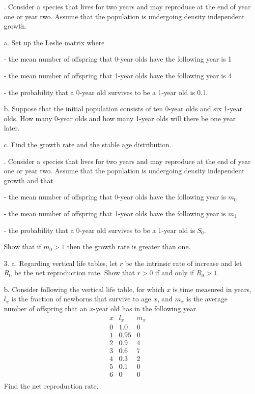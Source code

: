\documentclass[reqno,12pt]{amsart}
\begin{document}
\newpage

.  Consider a species that lives for two years and may reproduce
at the end of year one or year two.  Assume that the population is
undergoing density independent growth.

\noindent
a. Set up the Leslie matrix where

- the mean number of offspring that 0-year olds have the following
year is 1

- the mean number of offspring that 1-year olds have the following
year is 4

- the probability that a 0-year old survives to be a 1-year old
is 0.1.

\noindent
b.  Suppose that the initial population consists of ten 0-year
olds and six 1-year olds.  How many 0-year olds and how many
1-year olds will there be one year later.

\noindent
c.  Find the growth rate and the stable age distribution.

\newpage

.  Consider a species that lives for two years and may reproduce
at the end of year one or year two.  Assume that the population is
undergoing density independent growth and that

- the mean number of offspring that 0-year olds have the following
year is $m_0$

- the mean number of offspring that 1-year olds have the following
year is $m_1$

- the probability that a 0-year old survives to be a 1-year old
is $S_0$.

\noindent
Show that if $m_0>1$ then the growth rate is greater than one.

\newpage

3. a.  Regarding vertical life tables, let $r$ be the
intrinsic rate of increase and let $R_0$ be the net
reproduction rate.  Show that $r>0$ if and only if
$R_0>1$.

\vspace{8cm}

\noindent
b.  Consider following the vertical life table, for which
$x$ is time measured in years, $l_x$ is the fraction of
newborns that survive to age $x$, and $m_x$ is the average
number of offspring that an $x$-year old has in the following
year.
$$
\begin{matrix}
x & l_x  & m_x \\  \hline
0 & 1.0  & 0   \\
1 & 0.95 & 0   \\
2 & 0.9  & 4   \\
3 & 0.6  & 7   \\
4 & 0.3  & 2   \\
5 & 0.1  & 0   \\
6 &  0   & 0   \\
\end{matrix}
$$
Find the net reproduction rate.
\end{document}
